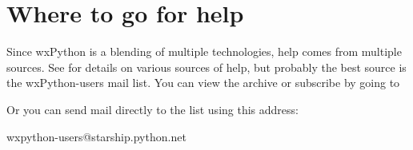 \section{Where to go for help}\label{wxphelp}

Since wxPython is a blending of multiple technologies, help comes from
multiple sources. See
 for details on
various sources of help, but probably the best source is the
wxPython-users mail list.  You can view the archive or subscribe by
going to


Or you can send mail directly to the list using this address:

wxpython-users@starship.python.net

